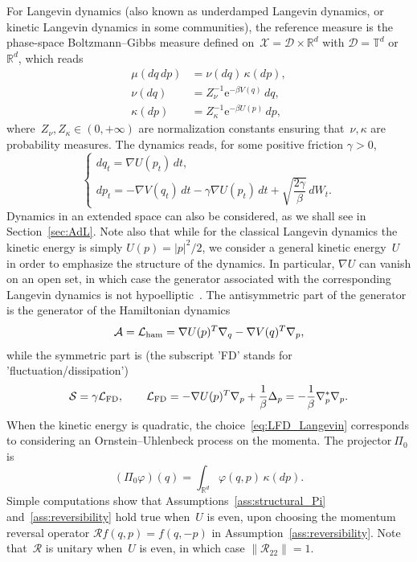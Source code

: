 \documentclass[AHL,Unicode,longabstracts,MathTools,published]{cedram}
\newcommand{\rme}{\mathrm{e}}
\newcommand{\cLs}{\mathcal{S}}
\newcommand{\cLa}{\mathcal{A}}
\newcommand{\cX}{\mathcal{X}}
\newcommand{\cD}{\mathcal{D}}
\newcommand{\cR}{\mathcal{R}}
\newcommand{\R}{\mathbb{R}}
\newcommand{\bbT}{\mathbb{T}}
\newcommand{\cLham}{\mathcal{L}_{\rm ham}}
\newcommand{\cLFD}{\mathcal{L}_{\rm FD}}
\begin{document}
For Langevin dynamics (also known as underdamped Langevin dynamics, or kinetic Langevin dynamics in some communities), the reference measure is the phase-space Boltzmann--Gibbs measure defined on~$\cX = \cD \times \R^d$ with $\cD = \bbT^d$ or~$\R^d$, which reads
\begin{equation}\label{eq:canonical_U_V}
\begin{split}
\mu(dq\,dp) &= \nu(dq)\,\kappa(dp), \\
 \nu(dq) &= Z_\nu^{-1} \rme^{-\beta V(q)} \,dq, \\\kappa(dp)&= Z_\kappa^{-1} \rme^{-\beta U(p)} \,dp,
\end{split}
\end{equation}
where~$Z_\nu,Z_\kappa \in (0,+\infty)$ are normalization constants ensuring that~$\nu,\kappa$ are probability measures. The dynamics reads, for some positive friction $\gamma > 0$,
\[
\begin{cases}
dq_t  = \nabla U(p_t) \, dt, \\
dp_t  = -\nabla V(q_t) \, dt - \gamma \nabla U(p_t) \, dt + \sqrt{\dfrac{2\gamma}{\beta}} \, dW_t.
\end{cases}
\]
Dynamics in an extended space can also be considered, as we shall see in Section~\ref{sec:AdL}. Note also that while for the classical Langevin dynamics the kinetic energy is simply $U(p) = |p|^2/2$, we consider a general kinetic energy~$U$ in order to emphasize the structure of the dynamics. In particular, $\nabla U$ can vanish on an open set, in which case the generator associated with the corresponding Langevin dynamics is not hypoelliptic~\cite{ST18}. The antisymmetric part of the generator is the generator of the Hamiltonian dynamics
\begin{equation}\label{eq:Lham}
\cLa = \cLham = \nabla U(p)^T \nabla_q - \nabla V(q)^T \nabla_p,
\end{equation}
while the symmetric part is (the subscript 'FD' stands for 'fluctuation/dissipation')
\begin{equation}\label{eq:LFD_Langevin}
\cLs = \gamma \cLFD,
\qquad
\cLFD = -\nabla U(p)^T \nabla_p + \frac1\beta \Delta_p = -\frac1\beta \nabla_p^* \nabla_p.
\end{equation}
When the kinetic energy is quadratic, the choice~\eqref{eq:LFD_Langevin} corresponds to considering an Ornstein--Uhlenbeck process on the momenta. The projector$~\Pi_0$ is
\begin{equation}\label{eq:def_Pi}
(\Pi_0 \varphi)(q) = \int_{\R^d} \varphi(q,p)\, \kappa(dp).
\end{equation}
Simple computations show that Assumptions~\ref{ass:structural_Pi} and~\ref{ass:reversibility} hold true when~$U$ is even, upon choosing the momentum reversal operator $\cR f(q, p) = f(q, -p)$ in Assumption~\ref{ass:reversibility}. Note that~$\cR$ is unitary when~$U$ is even, in which case $\|\cR_{22}\| = 1$.
\end{document}
